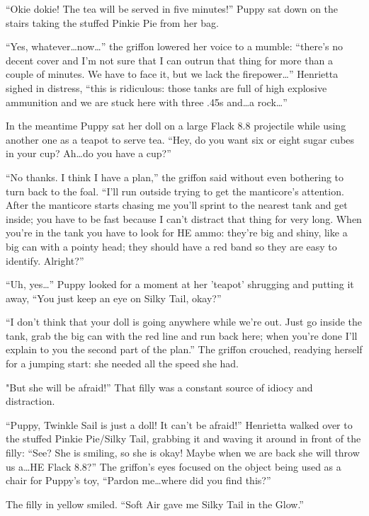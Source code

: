 ``Okie dokie! The tea will be served in five minutes!'' Puppy sat down on the stairs taking the stuffed Pinkie Pie from her bag.

``Yes, whatever\dots now\dots'' the griffon lowered her voice to a mumble: ``there's no decent cover and I'm not sure that I can outrun that thing for more than a couple of minutes. We have to face it, but we lack the firepower\dots'' Henrietta sighed in distress, ``this is ridiculous: those tanks are full of high explosive ammunition and we are stuck here with three .45s and\dots a rock\dots''

In the meantime Puppy sat her doll on a large Flack 8.8 projectile while using another one as a teapot to serve tea. ``Hey, do you want six or eight sugar cubes in your cup? Ah\dots do you have a cup?''

``No thanks. I think I have a plan,'' the griffon said without even bothering to turn back to the foal. ``I'll run outside trying to get the manticore's attention. After the manticore starts chasing me you'll sprint to the nearest tank and get inside; you have to be fast because I can't distract that thing for very long. When you're in the tank you have to look for HE ammo: they're big and shiny, like a big can with a pointy head; they should have a red band so they are easy to identify. Alright?''

``Uh, yes\dots'' Puppy looked for a moment at her 'teapot' shrugging and putting it away, ``You just keep an eye on Silky Tail, okay?''

``I don't think that your doll is going anywhere while we're out. Just go inside the tank, grab the big can with the red line and run back here; when you're done I'll explain to you the second part of the plan.'' The griffon crouched, readying herself for a jumping start: she needed all the speed she had.

"But she will be afraid!'' That filly was a constant source of idiocy and distraction.

``Puppy, Twinkle Sail is just a doll! It can't be afraid!'' Henrietta walked over to the stuffed Pinkie Pie/Silky Tail, grabbing it and waving it around in front of the filly: ``See? She is smiling, so she is okay! Maybe when we are back she will throw us a\dots HE Flack 8.8?'' The griffon's eyes focused on the object being used as a chair for Puppy's toy, ``Pardon me\dots where did you find this?''

The filly in yellow smiled. ``Soft Air gave me Silky Tail in the Glow.''

